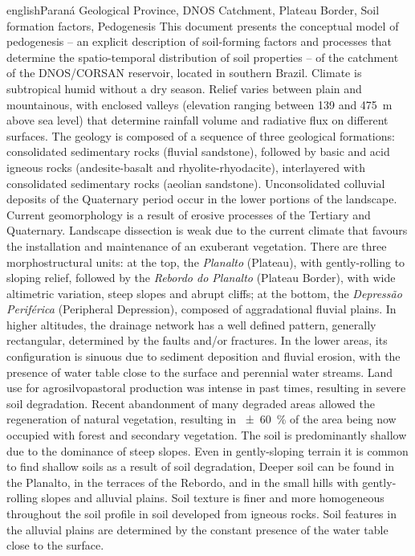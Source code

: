 \def\enkeys{Paraná Geological Province, DNOS Catchment, Plateau Border, Soil formation factors, Pedogenesis}
  
\begin{chapterabstract}{english}{\enkeys}
This document presents the conceptual model of pedogenesis -- an explicit description of soil-forming factors 
and 
processes that determine the spatio-temporal distribution of soil properties  -- of the 
catchment of the DNOS/CORSAN reservoir, located in southern Brazil. Climate is subtropical humid without a dry 
season. Relief varies between plain and mountainous, with enclosed valleys (elevation ranging between 
\num{139} and \SI{475}{\metre} above sea level) that determine rainfall volume and radiative flux on different 
surfaces. The geology is composed of a sequence of three geological formations: consolidated sedimentary rocks 
(fluvial sandstone), followed by basic and acid igneous rocks (andesite-basalt and rhyolite-rhyodacite), 
interlayered with consolidated sedimentary rocks (aeolian sandstone). Unconsolidated colluvial deposits of the 
Quaternary period occur in the lower portions of the landscape. Current geomorphology is a result of erosive 
processes of the Tertiary and Quaternary. Landscape dissection is weak due to the current climate that favours 
the installation and maintenance of an exuberant vegetation. There are three morphostructural units: at the 
top, the \textit{Planalto} (Plateau), with gently-rolling to sloping relief, followed by the \textit{Rebordo do 
Planalto} (Plateau Border), with wide altimetric variation, steep slopes and abrupt cliffs; at the bottom, the 
\textit{Depressão Periférica} (Peripheral Depression), composed of 
aggradational fluvial plains. In higher altitudes, the drainage network has a well defined pattern, generally 
rectangular, determined by the faults and/or fractures. In the lower areas, its configuration is sinuous due 
to 
sediment deposition and fluvial erosion, with the presence of water table close to the surface and perennial 
water 
streams. Land use for agrosilvopastoral production was intense in past times, resulting in severe soil 
degradation. Recent abandonment of many degraded areas allowed the regeneration of natural vegetation, 
resulting in \SI{\pm60}{\percent} of the area being now occupied with forest and secondary vegetation. The 
soil is predominantly shallow due to the dominance of steep slopes. Even in gently-sloping terrain it is 
common to find shallow soils as a result of soil degradation, Deeper soil can be found in the Planalto, in the 
terraces of the Rebordo, and in the small hills with gently-rolling slopes and alluvial plains. Soil texture 
is finer and more homogeneous throughout the soil profile in soil developed from igneous rocks. Soil 
features in the alluvial plains are determined by the constant presence of the water table close to the 
surface.
\end{chapterabstract}

